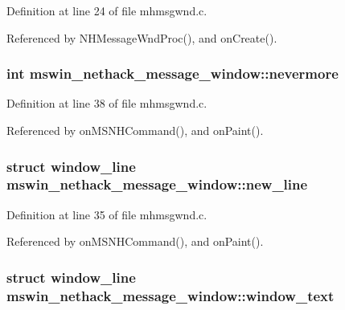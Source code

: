 Definition at line 24 of file mhmsgwnd.\+c.



Referenced by N\+H\+Message\+Wnd\+Proc(), and on\+Create().

\hypertarget{structmswin__nethack__message__window_a4da794907bafacc07e6227112897d153}{
\subsubsection[{nevermore}]{\setlength{\rightskip}{0pt plus 5cm}int mswin\+\_\+nethack\+\_\+message\+\_\+window\+::nevermore}}\label{structmswin__nethack__message__window_a4da794907bafacc07e6227112897d153}


Definition at line 38 of file mhmsgwnd.\+c.



Referenced by on\+M\+S\+N\+H\+Command(), and on\+Paint().

\hypertarget{structmswin__nethack__message__window_ac25c648cce60829c413d9ffa9da703bb}{
\subsubsection[{new\+\_\+line}]{\setlength{\rightskip}{0pt plus 5cm}struct {\bf window\+\_\+line} mswin\+\_\+nethack\+\_\+message\+\_\+window\+::new\+\_\+line}}\label{structmswin__nethack__message__window_ac25c648cce60829c413d9ffa9da703bb}


Definition at line 35 of file mhmsgwnd.\+c.



Referenced by on\+M\+S\+N\+H\+Command(), and on\+Paint().

\hypertarget{structmswin__nethack__message__window_a0e392ae401c1cc51fd7aa0cc8ecbae95}{
\subsubsection[{window\+\_\+text}]{\setlength{\rightskip}{0pt plus 5cm}struct {\bf window\+\_\+line} mswin\+\_\+nethack\+\_\+message\+\_\+window\+::window\+\_\+text}}\label{structmswin__nethack__message__window_a0e392ae401c1cc51fd7aa0cc8ecbae95}


